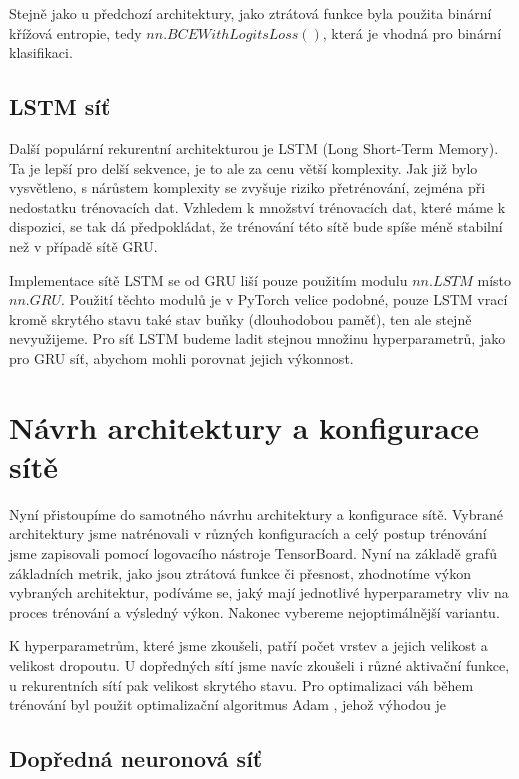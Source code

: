 Stejně jako u předchozí architektury, jako ztrátová funkce byla použita binární
křížová entropie, tedy $nn.BCEWithLogitsLoss()$, která je vhodná pro binární
klasifikaci.

\subsection{LSTM síť}

Další populární rekurentní architekturou je LSTM (Long Short-Term Memory). Ta
je lepší pro delší sekvence, je to ale za cenu větší komplexity. Jak již bylo
vysvětleno, s nárůstem komplexity se zvyšuje riziko přetrénování, zejména při
nedostatku trénovacích dat. Vzhledem k množství trénovacích dat, které máme k
dispozici, se tak dá předpokládat, že trénování této sítě bude spíše méně
stabilní než v případě sítě GRU.

Implementace sítě LSTM se od GRU liší pouze použitím modulu $nn.LSTM$ místo
$nn.GRU$. Použití těchto modulů je v PyTorch velice podobné, pouze LSTM vrací
kromě skrytého stavu také stav buňky (dlouhodobou paměť), ten ale stejně
nevyužijeme. Pro síť LSTM budeme ladit stejnou množinu hyperparametrů, jako pro
GRU síť, abychom mohli porovnat jejich výkonnost.

\section{Návrh architektury a konfigurace sítě}

Nyní přistoupíme do samotného návrhu architektury a konfigurace sítě. Vybrané
architektury jsme natrénovali v různých konfiguracích a celý postup trénování
jsme zapisovali pomocí logovacího nástroje TensorBoard. Nyní na základě grafů
základních metrik, jako jsou ztrátová funkce či přesnost, zhodnotíme výkon
vybraných architektur, podíváme se, jaký mají jednotlivé hyperparametry vliv na
proces trénování a výsledný výkon. Nakonec vybereme nejoptimálnější variantu.

K hyperparametrům, které jsme zkoušeli, patří počet vrstev a jejich velikost a
velikost dropoutu. U dopředných sítí jsme navíc zkoušeli i různé aktivační
funkce, u rekurentních sítí pak velikost skrytého stavu. Pro optimalizaci váh
během trénování byl použit optimalizační algoritmus Adam \cite{adam}, jehož
výhodou je

\subsection{Dopředná neuronová síť}

